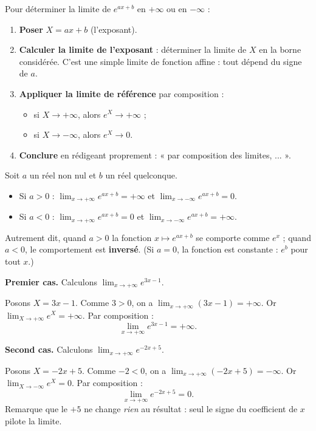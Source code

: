 \documentclass[11pt]{article}
\newcommand{\cle}[1]{{\popxbold\color{popdark}#1}}
\begin{document}
\begin{methode}
Pour déterminer la limite de $e^{ax+b}$ en $+\infty$ ou en $-\infty$ :
\begin{enumerate}
\item \textbf{Poser} $X = ax + b$ (l'exposant).
\item \textbf{Calculer la limite de l'exposant} : déterminer la limite de $X$ en la borne considérée. C'est une simple limite de fonction affine : tout dépend du \cle{signe de} $a$.
\item \textbf{Appliquer la limite de référence} par composition :
\begin{itemize}
\item si $X \to +\infty$, alors $e^X \to +\infty$ ;
\item si $X \to -\infty$, alors $e^X \to 0$.
\end{itemize}
\item \textbf{Conclure} en rédigeant proprement : « par composition des limites, ... ».
\end{enumerate}
\end{methode}

\begin{propriete}
Soit $a$ un réel non nul et $b$ un réel quelconque.
\begin{itemize}
\item Si $a > 0$ : $\displaystyle\lim_{x \to +\infty} e^{ax+b} = +\infty$ \quad et \quad $\displaystyle\lim_{x \to -\infty} e^{ax+b} = 0$.
\item Si $a < 0$ : $\displaystyle\lim_{x \to +\infty} e^{ax+b} = 0$ \quad et \quad $\displaystyle\lim_{x \to -\infty} e^{ax+b} = +\infty$.
\end{itemize}
Autrement dit, quand $a > 0$ la fonction $x \mapsto e^{ax+b}$ se comporte comme $e^x$ ; quand $a < 0$, le comportement est \textbf{inversé}. (Si $a = 0$, la fonction est constante : $e^{b}$ pour tout $x$.)
\end{propriete}

\begin{exemplebox}
\textbf{Premier cas.} Calculons $\displaystyle\lim_{x \to +\infty} e^{3x-1}$.

Posons $X = 3x - 1$. Comme $3 > 0$, on a $\displaystyle\lim_{x \to +\infty} (3x - 1) = +\infty$. Or $\displaystyle\lim_{X \to +\infty} e^X = +\infty$. Par composition :
\[ \lim_{x \to +\infty} e^{3x-1} = +\infty. \]

\textbf{Second cas.} Calculons $\displaystyle\lim_{x \to +\infty} e^{-2x+5}$.

Posons $X = -2x + 5$. Comme $-2 < 0$, on a $\displaystyle\lim_{x \to +\infty} (-2x + 5) = -\infty$. Or $\displaystyle\lim_{X \to -\infty} e^X = 0$. Par composition :
\[ \lim_{x \to +\infty} e^{-2x+5} = 0. \]
Remarque que le $+5$ ne change \emph{rien} au résultat : seul le signe du coefficient de $x$ pilote la limite.
\end{exemplebox}
\end{document}
